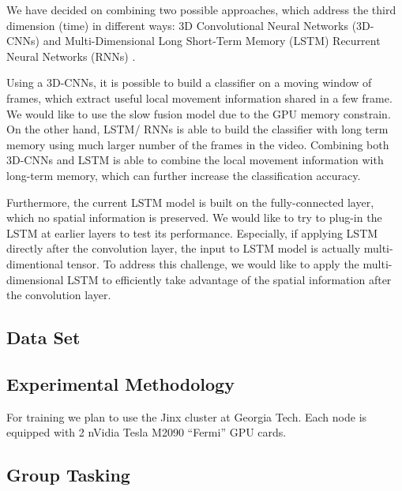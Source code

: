 We have decided on combining two possible approaches, which address
the third dimension (time) in different ways: 3D Convolutional Neural
Networks (3D-CNNs) \cite{stf,cnnvid} and Multi-Dimensional Long
Short-Term Memory (LSTM) Recurrent Neural Networks (RNNs) \cite{ltrcn}. 

Using a 3D-CNNs, it is possible to build a classifier on a moving window
of frames, which extract useful local movement information shared
in a few frame. We would like to use the slow fusion model \cite{cnnvid}
due to the GPU memory constrain. On the other hand, LSTM/ RNNs is
able to build the classifier with long term memory
using much larger number of the frames in the video. 
Combining both 3D-CNNs and LSTM is able to combine the
local movement information with long-term memory,
which can further increase the classification accuracy.

Furthermore, the current LSTM model is built on the fully-connected
layer, which no spatial information is preserved. We would like to
try to plug-in the LSTM at earlier layers to test its performance.
Especially, if applying LSTM directly after the convolution layer,
the input to LSTM model is actually multi-dimentional tensor. To address
this challenge, we would like to apply the multi-dimensional LSTM
\cite{byeon2015scene} to efficiently take advantage of the spatial
information after the convolution layer. 


\subsection*{Data Set}
\subsection*{Experimental Methodology}
\TODO{\dots}
For training we plan to use the Jinx cluster at Georgia Tech. Each node is equipped with 2 nVidia Tesla M2090 ``Fermi'' GPU cards.
\subsection*{Group Tasking}
\TODO{\dots}

